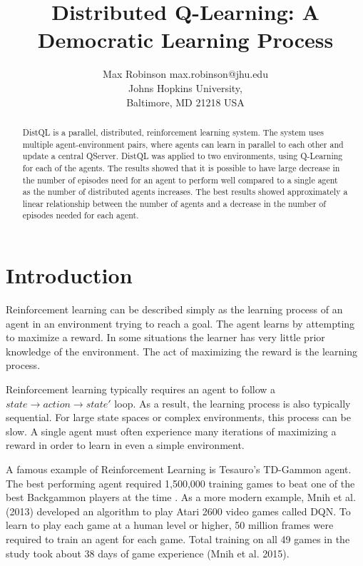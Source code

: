 \documentclass[jair,twoside,11pt,theapa]{article}
\begin{document}
\title{Distributed Q-Learning: A Democratic Learning Process}

\author{\name Max Robinson \email max.robinson@jhu.edu \\
       \addr Johns Hopkins University,\\
       Baltimore, MD 21218 USA
   }


\maketitle

\begin{abstract}
DistQL is a parallel, distributed, reinforcement learning system. The system uses multiple agent-environment pairs, where agents can learn in parallel to each other and update a central QServer. DistQL was applied to two environments, using Q-Learning for each of the agents. The results showed that it is possible to have large decrease in the number of episodes need for an agent to perform well compared to a single agent as the number of distributed agents increases. The best results showed approximately a linear relationship between the number of agents and a decrease in the number of episodes needed for each agent.
\end{abstract}

\section{Introduction}
\label{Introduction}
Reinforcement learning can be described simply as the learning process of an agent in an environment trying to reach a goal. 
The agent learns by attempting to maximize a reward. In some situations the learner has very little prior knowledge of the environment. 
The act of maximizing the reward is the learning process.

Reinforcement learning typically requires an agent to follow a $state \to action \to state'$ loop. As a result, the learning process is also typically sequential. 
For large state spaces or complex environments, this process can be slow. A single agent must often experience many iterations of maximizing 
a reward in order to learn in even a simple environment.

A famous example of Reinforcement Learning is Tesauro's TD-Gammon agent.
The best performing agent required 1,500,000 training games to beat one of the best Backgammon players at the time \cite{Tesauro:1995:TDL:203330.203343}.
As a more modern example, Mnih et al. (2013) \nocite{Mnih2013} developed an algorithm to play Atari 2600 video games called DQN. To learn to play each game at a human level or higher,
50 million frames were required to train an agent for each game. Total training on all 49 games in the study took about 38 days of game experience (Mnih et al. 2015). 
\end{document}
